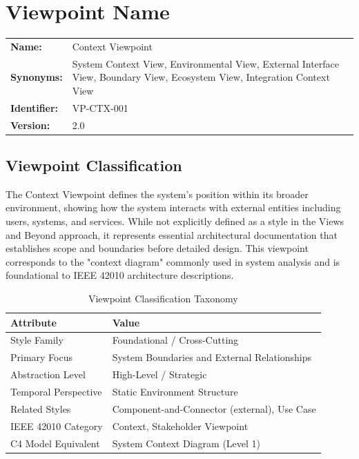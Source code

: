 \documentclass[11pt,letterpaper]{article}
\begin{document}
\section{Viewpoint Name}

\begin{definitionbox}
\begin{tabular}{@{}L{3.5cm}L{10cm}@{}}
\textbf{Name:} & Context Viewpoint \\[0.5em]
\textbf{Synonyms:} & System Context View, Environmental View, External Interface View, Boundary View, Ecosystem View, Integration Context View \\[0.5em]
\textbf{Identifier:} & VP-CTX-001 \\[0.5em]
\textbf{Version:} & 2.0 \\
\end{tabular}
\end{definitionbox}

\subsection{Viewpoint Classification}

The Context Viewpoint defines the system's position within its broader environment, showing how the system interacts with external entities including users, systems, and services. While not explicitly defined as a style in the Views and Beyond approach, it represents essential architectural documentation that establishes scope and boundaries before detailed design. This viewpoint corresponds to the "context diagram" commonly used in system analysis and is foundational to IEEE 42010 architecture descriptions.

\begin{table}[H]
\centering
\caption{Viewpoint Classification Taxonomy}
\begin{tabular}{@{}L{4cm}L{10cm}@{}}
\toprule
\textbf{Attribute} & \textbf{Value} \\
\midrule
Style Family & Foundational / Cross-Cutting \\
Primary Focus & System Boundaries and External Relationships \\
Abstraction Level & High-Level / Strategic \\
Temporal Perspective & Static Environment Structure \\
Related Styles & Component-and-Connector (external), Use Case \\
IEEE 42010 Category & Context, Stakeholder Viewpoint \\
C4 Model Equivalent & System Context Diagram (Level 1) \\
\bottomrule
\end{tabular}
\end{table}
\end{document}
